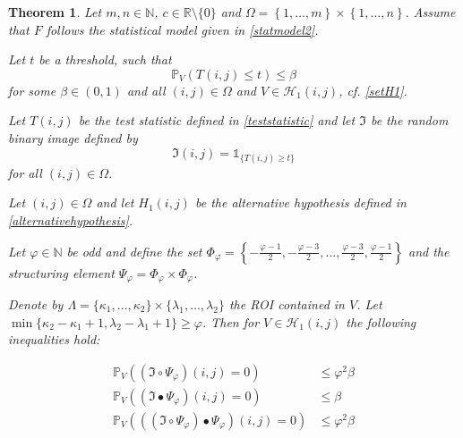 \documentclass[a4paper,12pt]{article}
\theoremstyle{plain}
\newtheorem{theorem}{Theorem}[section]
\theoremstyle{definition}
\numberwithin{equation}{section}
\begin{document}
\begin{theorem}\label{thm: typeIIinequalities}
	Let $m, n \in \mathbb{N}$, $c \in \mathbb{R} \setminus \{ 0 \}$ and $\Omega = \left\{ 1, \dots, m \right\} \times \left\{ 1, \dots, n \right\}$. Assume that $F$ follows the statistical model given in \eqref{statmodel2}.
	
	Let $t$ be a threshold, such that
	\begin{equation*}
		\mathbb{P}_V\left( T(i, j) \leq t \right) \leq \beta
	\end{equation*}
	for some $\beta \in (0, 1)$ and all $(i, j) \in \Omega$ and $V \in \mathcal{H}_1(i, j)$, cf. \eqref{setH1}.
	
	Let $T(i, j)$ be the test statistic defined in \eqref{teststatistic} and let $\mathfrak{I}$ be the random binary image defined by
	\begin{equation*}
		\mathfrak{I}(i, j) = \mathds{1}_{ \{ T(i, j) \geq t \} }
	\end{equation*}
	for all $(i, j) \in \Omega$.
	
	Let $(i, j) \in \Omega$ and let $H_1(i, j)$ be the alternative hypothesis defined in \eqref{alternativehypothesis}.
	
	Let $\varphi \in \mathbb{N}$ be odd and define the set $\Phi_\varphi = \left\{ -\frac{\varphi - 1}{2}, -\frac{\varphi - 3}{2}, \dots, \frac{\varphi - 3}{2}, \frac{\varphi - 1}{2} \right\}$ and the structuring element $\Psi_\varphi = \Phi_\varphi \times \Phi_\varphi$.
	
	Denote by $\varLambda = \{ \kappa_1, \dots, \kappa_2 \} \times \{ \lambda_1, \dots, \lambda_2 \}$ the ROI contained in $V$. Let $\min \{ \kappa_2 - \kappa_1 + 1, \lambda_2 - \lambda_1 + 1 \} \geq \varphi$.
	Then for $V \in \mathcal{H}_1(i, j)$ the following inequalities hold:
	\begin{samepage}
		\begin{align}
			\mathbb{P}_V\left( (\mathfrak{I} \circ \Psi_\varphi)(i, j) = 0 \right) &\leq \varphi^2 \beta \label{ineq: typeIIopening} \\
			\mathbb{P}_V\left( (\mathfrak{I} \bullet \Psi_\varphi)(i, j) = 0 \right) &\leq \beta \label{ineq: typeIIclosing} \\
			\mathbb{P}_V\left( ((\mathfrak{I} \circ \Psi_\varphi) \bullet \Psi_\varphi)(i, j) = 0 \right) &\leq \varphi^2 \beta \label{ineq: typeIIopeningclosing}
		\end{align}
	\end{samepage}
\end{theorem}
\end{document}

